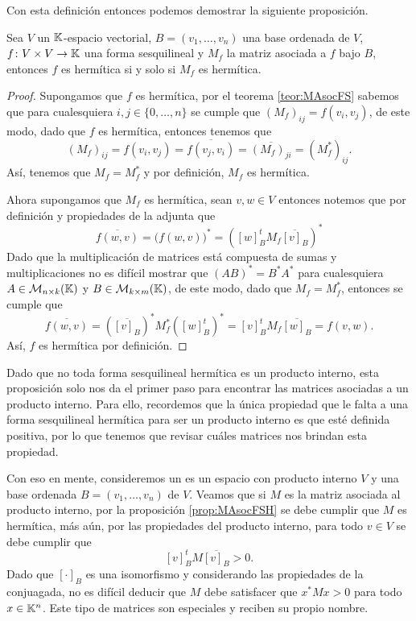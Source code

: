 Con esta definición entonces podemos demostrar la siguiente proposición.

\begin{prop}\label{prop:MAsocFSH}
  Sea $V$ un $\mathbb{K}$-espacio vectorial, $B = (v_1,\ldots,v_n)$ una base ordenada de $V$, $f\colon V\times V \to\mathbb{K}$ una forma sesquilineal y $M_f$ la matriz asociada a $f$ bajo $B$, entonces $f$ es hermítica si y solo si $M_f$ es hermítica.
\end{prop}
\begin{proof}
  Supongamos que $f$ es hermítica, por el teorema \ref{teor:MAsocFS} sabemos que para cualesquiera $i,j \in \{0,\ldots,n\}$ se cumple que $(M_f)_{ij} = f(v_i, v_j)$, de este modo, dado que $f$ es hermítica, entonces tenemos que
  \[
    (M_f)_{ij} = f(v_i, v_j) = \overline{f(v_j, v_i)} = \overline{(M_f)_{ji}} = (M_f^*)_{ij}.
  \]
  Así, tenemos que $M_f = M_f^*$ y por definición, $M_f$ es hermítica.

  Ahora supongamos que $M_f$ es hermítica, sean $v,w \in V$ entonces notemos que por definición y propiedades de la adjunta que
    \[
      \overline{f(w,v)} = \bigl(f(w,v)\bigr)^* = ([w]_B^t M_f \overline{[v]_B})^*
    \]
  Dado que la multiplicación de matrices está compuesta de sumas y multiplicaciones no es difícil mostrar que $(AB)^* = B^* A^*$ para cualesquiera $A \in \mathcal{M}_{n\times k} (\mathbb{K})$ y $B \in \mathcal{M}_{k\times m} (\mathbb{K})$, de este modo, dado que $M_f = M_f^*$, entonces se cumple que
    \[
      \overline{f(w,v)} =  (\overline{[v]_B})^* M_f^* ([w]_B^t)^* = [v]_B^tM_f \overline{[w]_B} = f(v,w).
    \]
  Así, $f$ es hermítica por definición.
\end{proof}

Dado que no toda forma sesquilineal hermítica es un producto interno, esta proposición solo nos da el primer paso para encontrar las matrices asociadas a un producto interno. Para ello, recordemos que la única propiedad que le falta a una forma sesquilineal hermítica para ser un producto interno es que esté definida positiva, por lo que tenemos que revisar cuáles matrices nos brindan esta propiedad.

Con eso en mente, consideremos un es un espacio con producto interno $V$ y una base ordenada $B = (v_1,\ldots,v_n)$ de $V$. Veamos que si $M$ es la matriz asociada al producto interno, por la proposición \ref{prop:MAsocFSH} se debe cumplir que $M$ es hermítica, más aún, por las propiedades del producto interno, para todo $v \in V$ se debe cumplir que 
  \[
    [v]_B^t M \overline{[v]_B} > 0.
  \]
Dado que $[\cdot]_B$ es una isomorfismo y considerando las propiedades de la conjuagada, no es difícil deducir que $M$ debe satisfacer que $x^* M x > 0$ para todo $x \in \mathbb{K}^n$. Este tipo de matrices son especiales y reciben su propio nombre.

